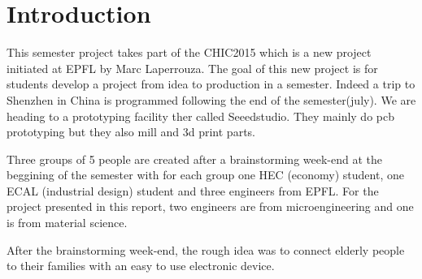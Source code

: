 \section{Introduction}

This semester project takes part of the CHIC2015 which is a new project initiated at EPFL by Marc Laperrouza. The goal of this new project is for students develop a project from idea to production in a semester. Indeed a trip to Shenzhen in China is programmed following the end of the semester(july). We are heading to a prototyping facility ther called Seeedstudio. They mainly do pcb prototyping but they also mill and 3d print parts.

Three groups of 5 people are created after a brainstorming week-end at the beggining of the semester with for each group one HEC (economy) student, one ECAL (industrial design) student and three engineers from EPFL. For the project presented in this report, two engineers are from microengineering and one is from material science.

After the brainstorming week-end, the rough idea was to connect elderly people to their families with an easy to use electronic device.